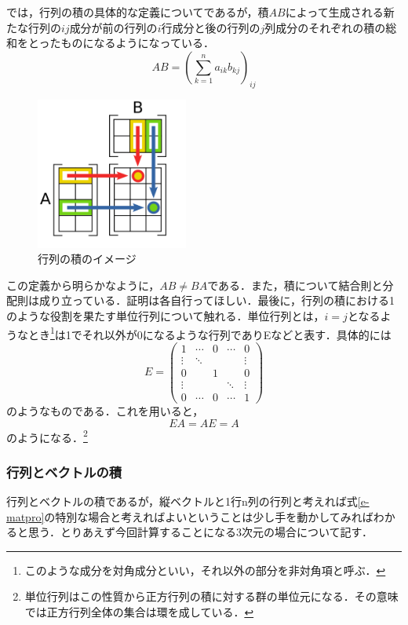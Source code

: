 \documentclass[dvipdfmx,a4]{jsarticle}
\begin{document}
では，行列の積の具体的な定義についてであるが，積\(AB\)によって生成される新たな行列の\(ij\)成分が前の行列の\(i\)行成分と後の行列の\(j\)列成分のそれぞれの積の総和をとったものになるようになっている．
\begin{equation}
  AB = \left (\sum ^n _{k=1} a_{ik}b_{kj} \right )_{ij}
  \label{e-matpro}
\end{equation}

\begin{figure}[tbh]
  \centering
  \includegraphics[height=5cm]{fig/matpro.png}
  \caption{行列の積のイメージ}
  \label{matpro}
\end{figure}
この定義から明らかなように，\(AB \neq BA\)である．また，積について結合則と分配則は成り立っている．証明は各自行ってほしい．最後に，行列の積における1のような役割を果たす単位行列について触れる．単位行列とは，\(i=j\)となるようなとき\footnote{このような成分を対角成分といい，それ以外の部分を非対角項と呼ぶ．}は1でそれ以外が0になるような行列でありEなどと表す．具体的には
\begin{equation*}
  E= 
  \begin{pmatrix}
    1 & \cdots & 0 & \cdots & 0\\
    \vdots & \ddots &        &        & \vdots \\
    0&        & 1&        & 0 \\
    \vdots &        &        & \ddots & \vdots \\
    0& \cdots & 0& \cdots & 1
    \end{pmatrix}
\end{equation*}
のようなものである．これを用いると，
\begin{equation*}
  EA= AE =A
\end{equation*}
のようになる．\footnote{単位行列はこの性質から正方行列の積に対する群の単位元になる．その意味では正方行列全体の集合は環を成している．}

\subsubsection{行列とベクトルの積}
行列とベクトルの積であるが，縦ベクトルと1行n列の行列と考えれば式\ref{e-matpro}の特別な場合と考えればよいということは少し手を動かしてみればわかると思う．とりあえず今回計算することになる3次元の場合について記す．
\end{document}
